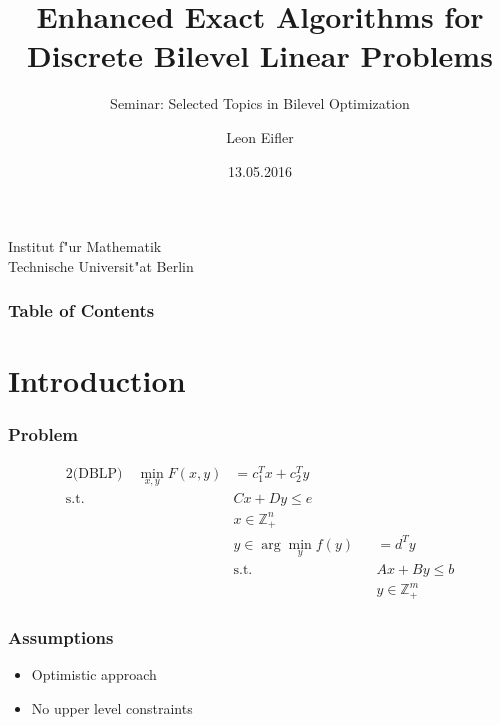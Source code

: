 \documentclass[11pt]{beamer}
\begin{document}
	\title %
	{Enhanced Exact Algorithms for Discrete Bilevel Linear Problems	}
	\subtitle{Seminar: Selected Topics in Bilevel Optimization}
	
	\author %
	{Leon Eifler}
	
	\institute %
	{
	
		Institut f"ur Mathematik\\
		Technische Universit"at Berlin
		
	}
	
	\date %
	{13.05.2016}
	

	\begin{frame}[plain]
	\titlepage

	\end{frame}
	

\begin{frame}
	\frametitle{Table of Contents}
	\tableofcontents
\end{frame}

\section{Introduction}

\begin{frame}	
	\frametitle{Problem}
	\begin{alignat*}{2}
		\text{(DBLP)} \quad \min_{x,y} F(x,y) &= c_1^Tx +c_2^Ty \\
		\text{s.t.} \quad &Cx + Dy \le e \\
		&x \in \mathbb{Z}^n_+ \\
		&y \in \arg \min_y f(y) &&= d^T y \\
		&\text{s.t.} &&Ax+By \le b \\
		& &&y \in \mathbb{Z}^m_+
	\end{alignat*}
\end{frame}

\begin{frame}
	\frametitle{Assumptions}
	\begin{itemize}
		\item Optimistic approach
		\item No upper level constraints
	\end{itemize}
\end{frame}
\end{document}
